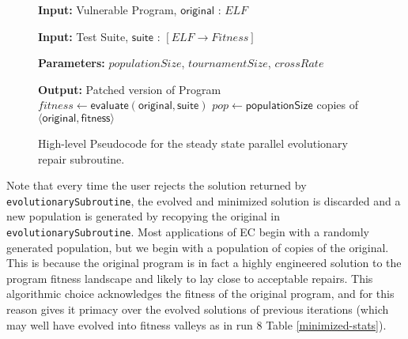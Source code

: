 \documentclass{sig-alternate}
\begin{document}
\begin{figure}[htb]
\begin{algorithmic}[1]
\small
\item[{\textbf{Input: }} {Vulnerable Program, $\mathsf{original}$ : $ELF$}]
\item[{\textbf{Input: }} {Test Suite, $\mathsf{suite}$ : $[ELF \rightarrow Fitness]$}]
\item[{\textbf{Parameters: }} {$populationSize$, $tournamentSize$, $crossRate$}]
\item[{\textbf{Output: }} {Patched version of Program}]
   $fitness \leftarrow \mathsf{evaluate}(\mathsf{original}, \mathsf{suite})$
   $pop \leftarrow \mathsf{populationSize}$ copies of $\langle \mathsf{original}, \mathsf{fitness} \rangle$
\end{algorithmic}
\caption{\label{evolutionary-subroutine}High-level Pseudocode for the
  steady state parallel evolutionary repair subroutine.}
\end{figure}

\noindent Note that every time the user rejects the solution returned
by \texttt{evolutionarySubroutine}, the evolved and minimized solution
is discarded and a new population is generated by recopying the
original in \texttt{evolutionarySubroutine}.  Most applications of EC
begin with a randomly generated population, but we begin with a
population of copies of the original.  This is because the original
program is in fact a highly engineered solution to the program fitness
landscape and likely to lay close to acceptable repairs.  This
algorithmic choice acknowledges the fitness of the original program,
and for this reason gives it primacy over the evolved solutions of
previous iterations (which may well have evolved into fitness valleys
as in run 8 Table \ref{minimized-stats}).
\end{document}
